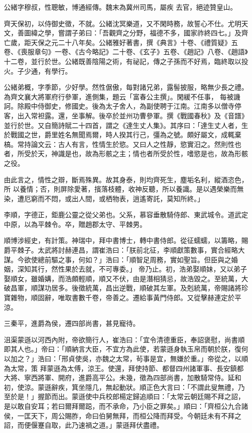 \begin{pinyinscope}
 公緒字穆叔，性聰敏，博通經傳。魏末為冀州司馬，屬疾
 去官，絕迹贊皇山。



 齊天保初，以侍御史徵，不就。公緒沈冥樂道，又不閑時務，故誓心不仕。尤明天文，善圖緯之學，嘗謂子弟曰：「吾觀齊之分野，福德不多，國家祚終四七。」及齊亡歲，距天保之元二十八年矣。公緒雅好著書，撰《典言》十卷、《禮質疑》五卷、《喪服章句》一卷、《古今略記》二十卷、《玄子》五卷、《趙記》八卷、《趙語》十二卷，並行於世。公緒既善陰陽之術，有祕記，傳之子孫而不好焉，臨終取以投火。子少通，有學行。



 公緒弟概，字季節，少好學。然性倨傲，每對諸兄弟，露髻披服，略無少長之禮。為齊文襄大將軍府行參軍，進側集，題云「富春公主撰」。閑緩不任事，
 每被譏訶。除殿中侍御史，修國史。後為太子舍人，為副使聘于江南。江南多以僧寺停客，出入常袒露。還，坐事解。後卒於並州功曹參軍。撰《戰國春秋》及《音譜》並行於世。又自簡詩賦二十四首，謂之《達生丈人集》。其序曰：「達生丈人者，生於戰國之世，爵里姓名無聞焉爾，時人揆其行己，彊為之號。頗好屬文，成輒棄槁。常持論文云：古人有言，性情生於慾。又曰人之性靜，慾實汨之。然則性也者，所受於天，神識是也，故為形骸之主；情也者所受於性，嗜慾是也，故為形骸之役。



 由此言之，情性之辯，斷焉殊異。故其身泰，則均齊死生，塵垢名利，縱酒恣色，所
 以養情；否，則屏除愛著，擯落枝體，收神反聽，所以養識。是以遇榮樂而無染，遭厄窮而不悶，或出人間，或栖物表，逍遙寄託，莫知所終。」



 李順，字德正，鉅鹿公靈之從父弟也。父系，慕容垂散騎侍郎、東武城令。道武定中原，以為平棘令。卒，贈趙郡太守、平棘男。



 順博涉經史，有計策。神瑞中，拜中書博士，轉中書侍郎。從征蠕蠕，以籌略，賜爵平棘子。太武將討赫連昌，謂崔浩曰：「朕前北征，李順獻策數事，實合經略大謀。今欲使總前驅之事，何如？」浩曰：「順智足周務，實如聖旨。但臣與之婚姻，深知其行，然性果於去就，不可專委。」
 帝乃止。初，浩弟娶順妹，又以弟子娶順女，雖婚媾，而浩頗輕順，順又不伏，由是潛相猜忌，故浩毀之。至統萬，大破昌軍，順謀功居多。後徵統萬，昌出逆戰，順破其左軍。及剋統萬，帝賜諸將珍寶雜物，順固辭，唯取書數千卷，帝善之。遷給事黃門侍郎。又從擊赫連定於平涼。



 三秦平，進爵為侯，遷四部尚書，甚見寵待。



 沮渠蒙遜以河西內附，帝欲簡行人，崔浩曰：「宜令清德重臣，奉詔褒慰，尚書順即其人也。」帝曰：「順納言大臣，不宜方為此使，若蒙遜身執玉帛而朝於朕，復何以加之？」浩曰：「邢貞使吳，亦魏之太常，茍事是宜，無嫌於重。」帝從之，以順為太常，策
 拜蒙遜為太傅，涼王。使還，拜使持節、都督四州諸軍事、長安鎮都大將、寧西將軍、開府，進爵高平公。未幾，徵為四部尚書，加散騎常侍。延和初，使涼。蒙遜辭疾，箕坐隱几，無起動狀。順正色大言曰：「不謂此叟無禮，乃至於是！」握節而出。蒙遜使中兵校郎楊定歸追順曰：「太常云朝廷賜不拜之詔，是以敢自安耳；若曰爾拜爾跽，而不承命，乃小臣之罪矣。」順曰：「齊桓公九合諸侯，一匡天下，周公賜胙，命曰伯舅無拜，而桓公降而拜受。今朝廷未有不拜之詔，而便偃蹇自取，此乃速禍之道。」蒙遜拜伏盡禮。




\end{pinyinscope}
